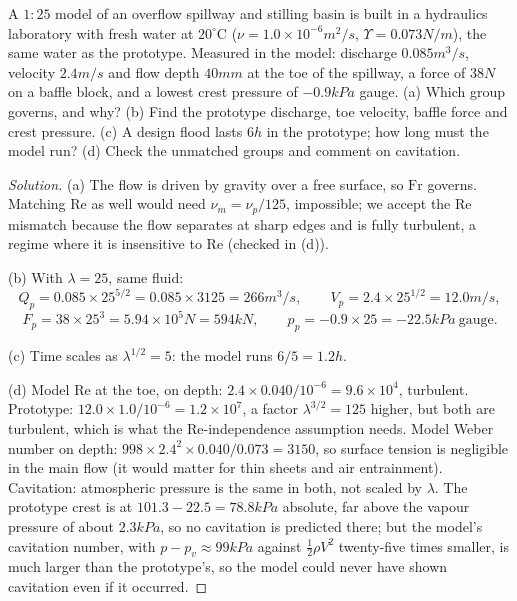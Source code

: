 \begin{example}
A $1{:}25$ model of an overflow spillway and stilling basin is built in a hydraulics laboratory with fresh water at $20^\circ$C ($\nu = 1.0\times10^{-6}\unit{m^2/s}$, $\Upsilon = 0.073\unit{N/m}$), the same water as the prototype. Measured in the model: discharge $0.085\unit{m^3/s}$, velocity $2.4\unit{m/s}$ and flow depth $40\unit{mm}$ at the toe of the spillway, a force of $38\unit{N}$ on a baffle block, and a lowest crest pressure of $-0.9\unit{kPa}$ gauge.
(a) Which group governs, and why? (b) Find the prototype discharge, toe velocity, baffle force and crest pressure. (c) A design flood lasts $6\unit{h}$ in the prototype; how long must the model run? (d) Check the unmatched groups and comment on cavitation.
\end{example}

\begin{proof}[Solution]
(a) The flow is driven by gravity over a free surface, so $\mathrm{Fr}$ governs. Matching $\mathrm{Re}$ as well would need $\nu_m = \nu_p/125$, impossible; we accept the $\mathrm{Re}$ mismatch because the flow separates at sharp edges and is fully turbulent, a regime where it is insensitive to $\mathrm{Re}$ (checked in (d)).

(b) With $\lambda = 25$, same fluid:
\[
Q_p = 0.085 \times 25^{5/2} = 0.085 \times 3125 = 266\unit{m^3/s}, \qquad V_p = 2.4 \times 25^{1/2} = 12.0\unit{m/s},
\]
\[
F_p = 38 \times 25^3 = 5.94\times10^5\unit{N} = 594\unit{kN}, \qquad p_p = -0.9 \times 25 = -22.5\unit{kPa}\ \text{gauge}.
\]

(c) Time scales as $\lambda^{1/2} = 5$: the model runs $6/5 = 1.2\unit{h}$.

(d) Model $\mathrm{Re}$ at the toe, on depth: $2.4 \times 0.040/10^{-6} = 9.6\times10^4$, turbulent. Prototype: $12.0 \times 1.0/10^{-6} = 1.2\times10^7$, a factor $\lambda^{3/2} = 125$ higher, but both are turbulent, which is what the Re-independence assumption needs. Model Weber number on depth: $998 \times 2.4^2 \times 0.040/0.073 = 3150$, so surface tension is negligible in the main flow (it would matter for thin sheets and air entrainment). Cavitation: atmospheric pressure is the same in both, not scaled by $\lambda$. The prototype crest is at $101.3 - 22.5 = 78.8\unit{kPa}$ absolute, far above the vapour pressure of about $2.3\unit{kPa}$, so no cavitation is predicted there; but the model's cavitation number, with $p - p_v \approx 99\unit{kPa}$ against $\tfrac12\rho V^2$ twenty-five times smaller, is much larger than the prototype's, so the model could never have shown cavitation even if it occurred.
\end{proof}

